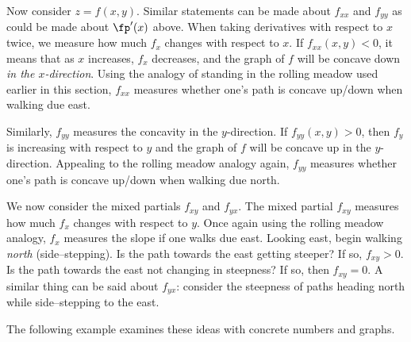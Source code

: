 Now consider $z=f(x,y)$. Similar statements can be made about $f_{xx}$ and $f_{yy}$ as could be made about $\fp'(x)$ above. When taking derivatives with respect to $x$ twice, we measure how much $f_x$ changes with respect to $x$. If $f_{xx}(x,y)<0$, it means that as $x$ increases, $f_x$ decreases, and the graph of $f$ will be concave down \textit{in the $x$-direction}. Using the analogy of standing in the rolling meadow used earlier in this section, $f_{xx}$ measures whether one's path is concave up/down when walking due east.

Similarly, $f_{yy}$ measures the concavity in the $y$-direction. If $f_{yy}(x,y)>0$, then $f_y$ is increasing with respect to $y$ and the graph of $f$ will be concave up in the $y$-direction. Appealing to the rolling meadow analogy again, $f_{yy}$ measures whether one's path is concave up/down when walking due north.

We now consider the mixed partials $f_{xy}$ and $f_{yx}$. The mixed partial $f_{xy}$ measures how much $f_x$ changes with respect to $y$. Once again using the rolling meadow analogy, $f_{x}$ measures the slope if one walks due east. Looking east, begin walking \textit{north} (side--stepping). Is the path towards the east getting steeper? If so, $f_{xy}>0$. Is the path towards the east not changing in steepness? If so, then $f_{xy}=0$. A similar thing can be said about $f_{yx}$: consider the steepness of paths heading north while side--stepping to the east.

The following example examines these ideas with concrete numbers and graphs.\\

